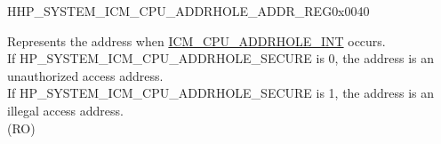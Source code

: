 \begin{register}{H}{HP\_SYSTEM\_ICM\_CPU\_ADDRHOLE\_ADDR\_REG}{0x0040}\label{regdesc:HPSYSTEMICMCPUADDRHOLEADDRREG}
%
\regnewline%
\begin{regdesc}\begin{reglist}
\label{fielddesc:HPSYSTEMICMCPUADDRHOLEADDR}\item [HP\_SYSTEM\_ICM\_CPU\_ADDRHOLE\_ADDR] Represents the address when \hyperref[tab:sysreg-int-sources]{ICM\_CPU\_ADDRHOLE\_INT} occurs.\\
If HP\_SYSTEM\_ICM\_CPU\_ADDRHOLE\_SECURE is 0, the address is an unauthorized access address.\\
If HP\_SYSTEM\_ICM\_CPU\_ADDRHOLE\_SECURE is 1, the address is an illegal access address.\\
(RO)
\end{reglist}\end{regdesc}
\end{register}


